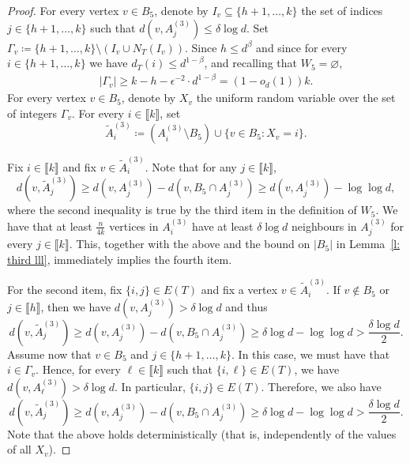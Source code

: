 \documentclass[notitlepage]{scrartcl}
\newcommand{\br}[1]{\llbracket{#1}\rrbracket}
\begin{document}
\begin{proof}
    For every vertex $v \in B_5$, denote by $I_v \subseteq \{h+1,\ldots,k\}$ the set of indices $j \in \{h+1,\ldots,k\}$ such that $d(v, A_j^{(3)}) \le \delta \log d$. Set $\Gamma_v \coloneqq \{h+1,\ldots,k\} \setminus (I_v \cup N_T(I_v))$. Since $h \le d^{\beta}$ and since for every $i \in \{h+1,\ldots,k\}$ we have $d_T(i) \le d^{1-\beta}$, and recalling that $W_5=\varnothing$,
    \begin{align}
        |\Gamma_v| \ge k - h - \epsilon^{-2} \cdot d^{1-\beta} = (1 - o_d(1)) k.\label{eq: gamma v}
    \end{align}
    For every vertex $v \in B_5$, denote by $X_v$ the uniform random variable over the set of integers $\Gamma_v$. For every $i \in \br{k}$, set
    \[
        \tilde{A}_i^{(3)} \coloneqq (A_i^{(3)} \setminus B_5) \cup \{v \in B_5 \colon X_v = i\}.
    \]
    
    Fix $i\in \br{k}$ and fix $v\in \tilde{A}_i^{(3)}$. Note that for any $j\in \br{k}$,
    \[
        d(v, \tilde{A}_j^{(3)}) \ge d(v, A_j^{(3)}) - d(v, B_5 \cap A_j^{(3)})\ge d(v,A_j^{(3)})-\log\log d,
    \]
    where the second inequality is true by the third item in the definition of $W_5$. We have that at least $\frac{n}{4k}$ vertices in $A_i^{(3)}$ have at least $\delta\log d$ neighbours in $A_j^{(3)}$ for every $j\in \br{k}$. This, together with the above and the bound on $|B_5|$ in Lemma~\ref{l: third lll}, immediately implies the fourth item.
    
    For the second item, fix $\{i,j\} \in E(T)$ and fix a vertex $v \in \tilde{A}_i^{(3)}$. If $v \notin B_5$ or $j \in \br{h}$, then we have $d(v, A_j^{(3)}) > \delta \log d$ and thus
    \[
        d(v, \tilde{A}_j^{(3)}) \ge d(v, A_j^{(3)}) - d(v, B_5 \cap A_j^{(3)}) \ge \delta \log d - \log \log d>\frac{\delta \log d}{2}.
    \]
    Assume now that $v \in B_5$ and $j \in \{h+1,\ldots,k\}$. In this case, we must have that $i \in \Gamma_v$. Hence, for every $\ell \in \br{k}$ such that $\{i, \ell\} \in E(T)$, we have $d(v, A_{\ell}^{(3)}) > \delta \log d$. In particular, $\{i,j\}\in E(T)$. Therefore, we also have
    \[
        d(v, \tilde{A}_j^{(3)}) \ge d(v, A_j^{(3)}) - d(v, B_5 \cap A_j^{(3)}) \ge \delta \log d - \log \log d>\frac{\delta \log d}{2}.
    \]
    Note that the above holds deterministically (that is, independently of the values of all $X_v$). 


\end{proof}
\end{document}
